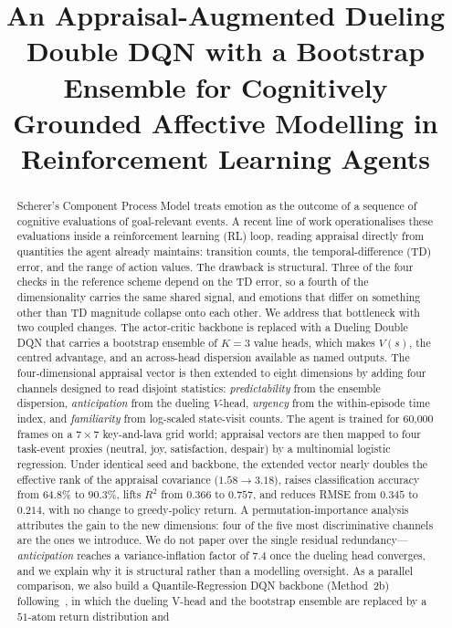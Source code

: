 \documentclass[conference]{IEEEtran}
\title{An Appraisal-Augmented Dueling Double DQN with a Bootstrap Ensemble for
Cognitively Grounded Affective Modelling in Reinforcement Learning Agents}
\author{
\IEEEauthorblockN{Dev Shrut Jain}
\IEEEauthorblockA{Department of Artificial Intelligence \\
SVNIT, Surat \\
Email: jaindevshrut@gmail.com}
\and
\IEEEauthorblockN{Sweta Rana}
\IEEEauthorblockA{Department of Artificial Intelligence \\
SVNIT, Surat \\
Email: ranasweta2005@gmail.com}
\and
\IEEEauthorblockN{Krish Rathod}
\IEEEauthorblockA{Department of Artificial Intelligence \\
SVNIT, Surat \\
Email: krishrathod5696@gmail.com}

}
\begin{document}
\maketitle

\begin{abstract}
Scherer's Component Process Model treats emotion as the outcome of a sequence
of cognitive evaluations of goal-relevant events. A recent line of work
operationalises these evaluations inside a reinforcement learning (RL) loop,
reading appraisal directly from quantities the agent already maintains:
transition counts, the temporal-difference (TD) error, and the range of action
values. The drawback is structural. Three of the four checks in the reference
scheme depend on the TD error, so a fourth of the dimensionality carries the
same shared signal, and emotions that differ on something other than TD
magnitude collapse onto each other. We address that bottleneck with two
coupled changes. The actor-critic backbone is replaced with a Dueling Double
DQN that carries a bootstrap ensemble of $K{=}3$ value heads, which makes
$V(s)$, the centred advantage, and an across-head dispersion available as
named outputs. The four-dimensional appraisal vector is then extended to
eight dimensions by adding four channels designed to read disjoint
statistics: \emph{predictability} from the ensemble dispersion,
\emph{anticipation} from the dueling $V$-head, \emph{urgency} from the
within-episode time index, and \emph{familiarity} from log-scaled state-visit
counts. The agent is trained for 60{,}000 frames on a $7{\times}7$
key-and-lava grid world; appraisal vectors are then mapped to four
task-event proxies (neutral, joy, satisfaction, despair) by a multinomial
logistic regression. Under identical seed and backbone, the extended vector
nearly doubles the effective rank of the appraisal covariance
($1.58{\to}3.18$), raises classification accuracy from $64.8\%$ to $90.3\%$,
lifts $R^{2}$ from $0.366$ to $0.757$, and reduces RMSE from $0.345$ to
$0.214$, with no change to greedy-policy return. A permutation-importance
analysis attributes the gain to the new dimensions: four of the five most
discriminative channels are the ones we introduce. We do not paper over the
single residual redundancy---\emph{anticipation} reaches a variance-inflation
factor of $7.4$ once the dueling head converges, and we explain why it
is structural rather than a modelling oversight. As a
parallel comparison, we also build a Quantile-Regression DQN backbone
(Method~2b) following~\cite{dabney2018qrdqn}, in which the dueling V-head and
the bootstrap ensemble are replaced by a $51$-atom return distribution and

\end{abstract}
\end{document}
